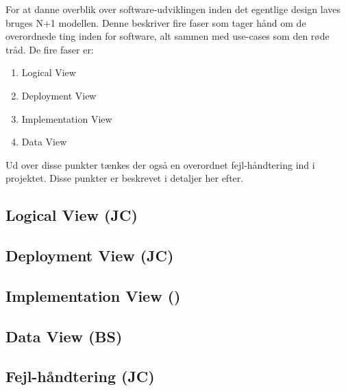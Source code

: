 For at danne overblik over software-udviklingen inden det egentlige design laves bruges N+1 modellen.
Denne beskriver fire faser som tager hånd om de overordnede ting inden for software, alt sammen med use-cases som den røde tråd.
De fire faser er:

\begin{enumerate}
	\item Logical View
	\item Deployment View
	\item Implementation View
	\item Data View
\end{enumerate}

Ud over disse punkter tænkes der også en overordnet fejl-håndtering ind i projektet. Disse punkter er beskrevet i detaljer her efter.


\subsection{Logical View (JC)}


\clearpage
\subsection{Deployment View (JC)}



\subsection{Implementation View ()}


\subsection{Data View (BS)}


\subsection{Fejl-håndtering (JC)}


%